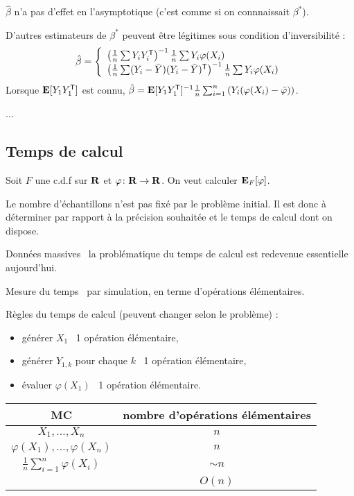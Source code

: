 	\begin{rem}
		$\hat{\beta}$ n'a pas d'effet en l'asymptotique (c'est comme si on connnaissait $\beta^*$).
	\end{rem}
	
	\begin{rem}
		D'autres estimateurs de $\beta^*$ peuvent être légitimes sous condition d'inversibilité :
		$$\hat{\beta} = \left\{ \begin{array}{l}
			\left( \frac{1}{n} \sum Y_i Y_i^\mathsf{T} \right)^{-1} \frac{1}{n} \sum Y_i \varphi(X_i) \\
			\left( \frac{1}{n} \sum (Y_i - \bar{Y}) (Y_i - \bar{Y})^\mathsf{T} \right)^{-1} \frac{1}{n} \sum Y_i \varphi(X_i)
			\end{array} \right.$$
		Lorsque $\mathbf{E}[Y_1 Y_1^\mathsf{T}]$ est connu, $\hat{\beta} = \mathbf{E}[Y_1 Y_1^\mathsf{T}]^{-1} \frac{1}{n} \sum_{i = 1}^n \left( Y_i (\varphi(X_i) - \bar{\varphi}) \right)$.
	\end{rem}
	
	...


\subsection{Temps de calcul}

	Soit $F$ une c.d.f sur $\mathbf{R}$ et $\varphi \colon \mathbf{R} \to \mathbf{R}$.
	On veut calculer $\mathbf{E}_F[\varphi]$.
	
	Le nombre d'échantillons n'est pas fixé par le problème initial.
	Il est donc à déterminer par rapport à la précision souhaitée et le temps de calcul dont on dispose.
	
	Données massives \textrightarrow\ la problématique du temps de calcul est redevenue essentielle aujourd'hui.
	
	Mesure du temps \textrightarrow\ par simulation, en terme d'opérations élémentaires.
	
	Règles du temps de calcul (peuvent changer selon le problème) :
	\begin{itemize}
		\item[\textbullet] générer $X_1$ \textrightarrow\ 1 opération élémentaire,
		\item[\textbullet] générer $Y_{1,k}$ pour chaque $k$ \textrightarrow\ 1 opération élémentaire,
		\item[\textbullet] évaluer $\varphi(X_1)$ \textrightarrow\ 1 opération élémentaire.\\
	\end{itemize}
	
	\begin{tabular}{c|c}
	MC & nombre d'opérations élémentaires \\
	\hline
	$X_1,\ldots,X_n$ & $n$ \\
	$\varphi(X_1),\ldots,\varphi(X_n)$ & $n$ \\
	$\frac{1}{n} \sum_{i = 1}^n \varphi(X_i)$ & $\sim  n$\\
	 & $O(n)$\\
	\end{tabular}
	
